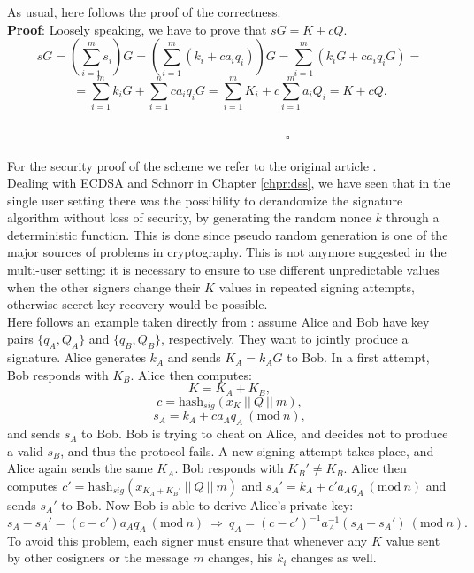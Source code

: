 \bigskip
\noindent
As usual, here follows the proof of the correctness.
\\
{\bf Proof}: Loosely speaking, we have to prove that $sG = K + cQ$.
\\
$$sG = \left(\sum_{i = 1}^{m} s_i\right)G = \left(\sum_{i = 1}^{m}(k_i + ca_iq_i)\right)G = \sum_{i = 1}^{m}(k_iG + ca_iq_iG) =$$
$$= \sum_{i = 1}^{m}k_iG + \sum_{i = 1}^{n} ca_iq_iG = \sum_{i = 1}^{m}K_i + c\sum_{i  = 1}^{m}a_iQ_i = K + cQ.$$
\ \ \ \ \ \ \ \ \ \ \ \ \ \ \ \ \ \ \ \ \ \ \ \ \ \ \ \ \ \ \ \ \ \ \ \ \ \ \ \ \ \ \ \ \ \ \ \ \ \ \ \ \ \ \ \ \ \ \ \ \ \ \ \ \ \ \ \ \ \ \ \ \ \ \ \ \ \ \ \ \ \ \ \ \ \ \ \ \ \ \ \ \ \ \ \ \ \ \ \ \ \ \ \ \ \ \ \ \ \ \ \ \ \ \ \ \ $\square$

\bigskip
\noindent
For the security proof of the scheme we refer to the original article \cite{RefWork:11}. 
\\
Dealing with ECDSA and Schnorr in Chapter \ref{chpr:dss}, we have seen that in the single user setting there was the possibility to derandomize the signature algorithm without loss of security, by generating the random nonce $k$ through a deterministic function. This is done since pseudo random generation is one of the major sources of problems in cryptography. This is not anymore suggested in the multi-user setting: it is necessary to ensure to use different unpredictable values when the other signers change their $K$ values in repeated signing attempts, otherwise secret key recovery would be possible. 
\\
Here follows an example taken directly from \cite{RefWork:11}: assume Alice and Bob have key pairs $\{q_A, Q_A\}$ and $\{q_B, Q_B\}$, respectively. They want to jointly produce a signature. Alice generates $k_A$ and sends $K_A = k_AG$ to Bob. In a first attempt, Bob responds with $K_B$. Alice then computes:
$$K = K_A + K_B,$$
$$c = \text{hash}_{sig}(x_K \ || \ Q \ || \ m),$$
$$s_A = k_A + ca_Aq_A \ (\text{mod} \ n),$$
and sends $s_A$ to Bob. Bob is trying to cheat on Alice, and decides not to produce a valid $s_B$, and thus the protocol fails. A new signing attempt takes place, and Alice again sends the same $K_A$. Bob responds with $K_B' \neq K_B$. Alice then computes $c' = \text{hash}_{sig}(x_{K_A + K_B'} \ || \ Q \ || \ m)$ and $s_A' = k_A + c'a_Aq_A \ (\text{mod} \ n)$ and sends $s_A'$ to Bob. Now Bob is able to derive Alice's private key:
$$s_A - s_A' = (c - c')a_Aq_A \ (\text{mod} \ n) \ \Longrightarrow \ q_A = (c - c')^{-1}a_A^{-1}(s_A - s_A') \ (\text{mod} \ n).$$
To avoid this problem, each signer must ensure that whenever any $K$ value sent by other cosigners or the message $m$ changes, his $k_i$ changes as well. 

